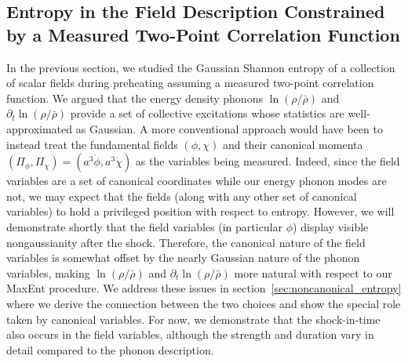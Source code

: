 \documentclass[11pt,a4paper]{article}
\def\lnr{\ln(\rho/\bar{\rho})}
\def\dlnr{\partial_t\ln(\rho/\bar{\rho})}
\begin{document}
\subsection{Entropy in the Field Description Constrained by a Measured Two-Point Correlation Function}
In the previous section, we studied the Gaussian Shannon entropy of a collection of scalar fields during preheating assuming a measured two-point correlation function.
We argued that the energy density phonons $\lnr$ and $\dlnr$ provide a set of collective excitations whose statistics are well-approximated as Gaussian.
A more conventional approach would have been to instead treat the fundamental fields $(\phi,\chi)$ and their canonical momenta $(\Pi_\phi,\Pi_\chi)=(a^3\dot{\phi},a^3\dot{\chi})$ as the variables being measured.
Indeed, since the field variables are a set of canonical coordinates while our energy phonon modes are not, we may expect that the fields (along with any other set of canonical variables) to hold a privileged position with respect to entropy.
However, we will demonstrate shortly that the field variables (in particular $\phi$) display visible nongaussianity after the shock.
Therefore, the canonical nature of the field variables is somewhat offset by the nearly Gaussian nature of the phonon variables, making $\lnr$ and $\dlnr$ more natural with respect to our MaxEnt procedure.
We address these issues in section~\ref{sec:noncanonical_entropy} where we derive the connection between the two choices and show the special role taken by canonical variables.
For now, we demonstrate that the shock-in-time also occurs in the field variables, although the strength and duration vary in detail compared to the phonon description.
\end{document}
